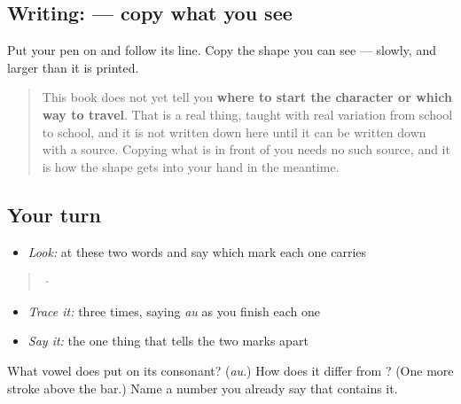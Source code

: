 \subsection*{Writing:  — copy what you see}
Put your pen on \textbf{} and follow its line. Copy the shape you can see — slowly, and larger than it is printed.

\begin{quote}
This book does not yet tell you \textbf{where to start the character or which way to travel}. That is a real thing, taught with real variation from school to school, and it is not written down here until it can be written down with a source. Copying what is in front of you needs no such source, and it is how the shape gets into your hand in the meantime.
\end{quote}

\subsection*{Your turn}
\begin{itemize}
\raggedright
  \item \emph{Look:} at these two words and say which mark each one carries
\end{itemize}

\begin{quote}
  ·  
\end{quote}

\begin{itemize}
\raggedright
  \item \emph{Trace it:}  three times, saying \emph{au} as you finish each one
  \item \emph{Say it:} the one thing that tells the two marks apart
\end{itemize}

\begin{tcolorbox}[breakable,colback=teal!4,colframe=teal!35!black,title={Before you move on}]
What vowel does \textbf{} put on its consonant? (\emph{au}.) How does it differ from \textbf{}? (One more stroke above the bar.) Name a number you already say that contains it.
\end{tcolorbox}
